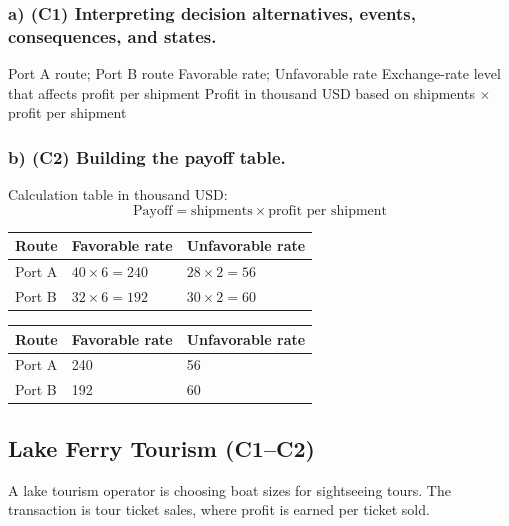 	\subsubsection*{a) \textbf{(C1)} Interpreting decision alternatives, events, consequences, and states.}
	\label{subsec:problem6-coffee-export-routes-c1}
	\DecisionElementsTable
	{Port A route; Port B route}
	{Favorable rate; Unfavorable rate}
	{Exchange-rate level that affects profit per shipment}
	{Profit in thousand USD based on shipments $\times$ profit per shipment}
	
	
	\subsubsection*{b) \textbf{(C2)} Building the payoff table.}
	\label{subsec:problem6-coffee-export-routes-c2}
	Calculation table in thousand USD:
	\[
	\text{Payoff}=\text{shipments}\times\text{profit per shipment}
	\]
	\begin{center}
		\begin{tabular}{lll}
			\toprule
			Route & Favorable rate & Unfavorable rate \\
			\midrule
			Port A & $40 \times 6 = 240$ & $28 \times 2 = 56$ \\
			Port B & $32 \times 6 = 192$ & $30 \times 2 = 60$ \\
			\bottomrule
		\end{tabular}
	\end{center}
	
	\begin{center}
		\begin{tabular}{lll}
			\toprule
			Route & Favorable rate & Unfavorable rate \\
			\midrule
			Port A & 240 & 56 \\
			Port B & 192 & 60 \\
			\bottomrule
		\end{tabular}
	\end{center}
	
	
	\subsection{Lake Ferry Tourism (C1--C2)}
	\label{sec:problem7-lake-ferry-tourism-c1-c2}
	A lake tourism operator is choosing boat sizes for sightseeing tours. The transaction is tour ticket sales, where profit is earned per ticket sold.
	
